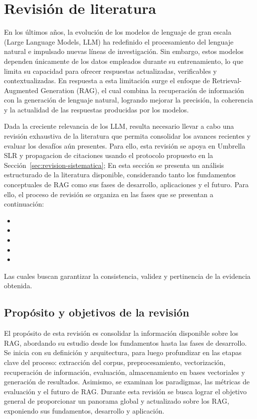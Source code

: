 \section{Revisión de literatura}
En los últimos años, la evolución de los modelos de lenguaje de gran escala (Large Language Models, LLM) ha redefinido el procesamiento del lenguaje natural
e impulsado nuevas líneas de investigación. 
Sin embargo, estos modelos dependen únicamente de los datos empleados durante su entrenamiento, lo que limita su capacidad para ofrecer respuestas actualizadas, verificables y 
contextualizadas. En respuesta a esta limitación surge el enfoque de Retrieval-Augmented Generation (RAG), el cual combina la recuperación de información con la generación de 
lenguaje natural, logrando mejorar la precisión, la coherencia y la actualidad de las respuestas producidas por los modelos.

Dada la creciente relevancia de los LLM, resulta necesario llevar a cabo una revisión exhaustiva de la literatura que permita consolidar los avances recientes y evaluar los desafíos aún presentes.
Para ello, esta revisión se apoya en Umbrella SLR y propagacion de citaciones usando el protocolo propuesto en la Sección~\ref{sec:revision-sistematica};
En esta sección se presenta un análisis estructurado de la literatura disponible, considerando tanto los fundamentos conceptuales de RAG como sus fases de desarrollo, 
aplicaciones y el futuro. Para ello, el proceso de revisión se organiza en las fases que se presentan a continuación:

\begin{itemize}
    \item {}
    \item {}
    \item {}
    \item {}
    \item {}
\end{itemize}
Las cuales buscan garantizar la consistencia, validez y pertinencia de la evidencia obtenida.

\subsection{Propósito y objetivos de la revisión}
\label{subsec:proposito-objetivos}
El propósito de esta revisión es consolidar la información disponible sobre los RAG, abordando su estudio desde los fundamentos hasta las fases de desarrollo. 
Se inicia con su definición y arquitectura, para luego profundizar en las etapas clave del proceso: extracción del corpus, preprocesamiento, vectorización, recuperación de información, 
evaluación, almacenamiento en bases vectoriales y generación de resultados. Asimismo, se examinan los paradigmas, las métricas de evaluación y el futuro de RAG.
Durante esta revisión se busca lograr el objetivo general de proporcionar un panorama global y actualizado sobre los RAG,
exponiendo sus fundamentos, desarrollo y aplicación.


